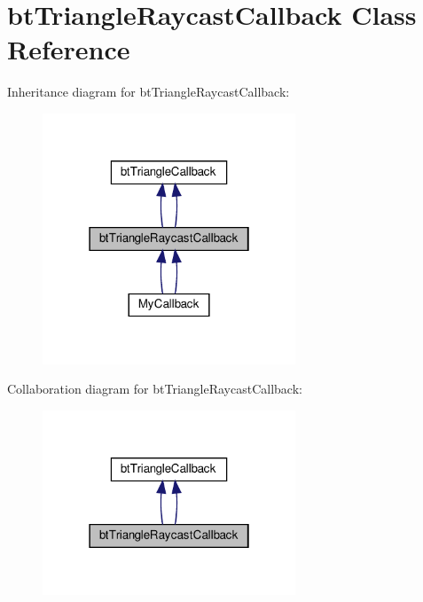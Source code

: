 \hypertarget{classbtTriangleRaycastCallback}{}\section{bt\+Triangle\+Raycast\+Callback Class Reference}
\label{classbtTriangleRaycastCallback}


Inheritance diagram for bt\+Triangle\+Raycast\+Callback\+:
\nopagebreak
\begin{figure}[H]
\begin{center}
\leavevmode
\includegraphics[width=214pt]{classbtTriangleRaycastCallback__inherit__graph}
\end{center}
\end{figure}


Collaboration diagram for bt\+Triangle\+Raycast\+Callback\+:
\nopagebreak
\begin{figure}[H]
\begin{center}
\leavevmode
\includegraphics[width=214pt]{classbtTriangleRaycastCallback__coll__graph}
\end{center}
\end{figure}
